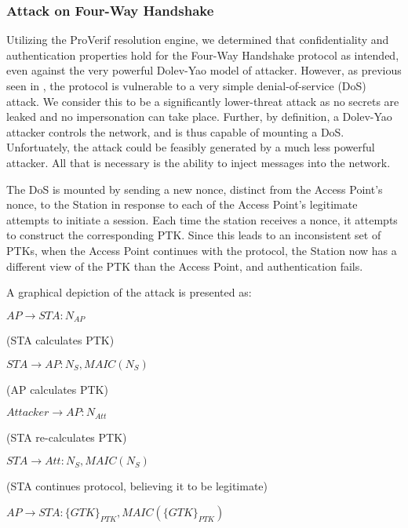 \documentclass[11pt, twocolumn]{article} %
\begin{document}
{\subsubsection{Attack on Four-Way Handshake}
Utilizing the ProVerif resolution engine, we determined that confidentiality and authentication properties hold for the Four-Way Handshake protocol as intended, even against the very powerful Dolev-Yao model of attacker.  However, as previous seen in \cite{he04}, the protocol is vulnerable to a very simple denial-of-service (DoS) attack.  We consider this to be a significantly lower-threat attack as no secrets are leaked and no impersonation can take place.  Further, by definition, a Dolev-Yao attacker controls the network, and is thus capable of mounting a DoS.  Unfortuately, the attack could be feasibly generated by a much less powerful attacker.  All that is necessary is the ability to inject messages into the network.  

The DoS is mounted by sending a new nonce, distinct from the Access Point's nonce, to the Station in response to each of the Access Point's legitimate attempts to initiate a session.  Each time the station receives a nonce, it attempts to construct the corresponding PTK.  Since this leads to an inconsistent set of PTKs, when the Access Point continues with the protocol, the Station now has a different view of the PTK than the Access Point, and authentication fails.  

A graphical depiction of the attack is presented as:  

\begin{enumerate}[leftmargin=5mm]
{\small
\item $AP \rightarrow STA: N_{AP}$

{\tiny (STA calculates PTK)}

\item $STA \rightarrow AP: N_S, MAIC(N_S)$

{\tiny (AP calculates PTK) }

\item $Attacker \rightarrow AP: N_{Att}$

{\tiny (STA re-calculates PTK) }

\item $STA \rightarrow Att: N_S, MAIC(N_S)$

{\tiny (STA continues protocol, believing it to be legitimate)}

\item $AP \rightarrow STA: \{GTK\}_{PTK}, MAIC(\{GTK\}_{PTK})$

}
\end{enumerate}}
\end{document}
